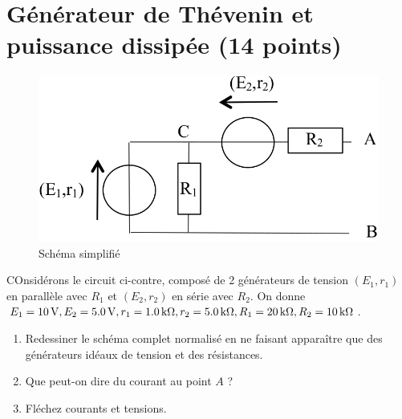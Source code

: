 \documentclass[10pt,a4paper]{article}
\begin{document}
\newpage

\section{Générateur de Thévenin et puissance dissipée (14 points)}
\begin{figure}
    \vspace*{-25pt}
    \raggedleft
    \includegraphics[width=\linewidth]{th_solo.png}
    \captionsetup{justification=centering}
    \caption{Schéma simplifié}
    \label{fig:solo}
\end{figure}
COnsidérons le circuit ci-contre, composé de 2 générateurs de tension 
$(E_1, r_1)$ en parallèle avec $R_1$ et $(E_2, r_2)$ en série avec $R_2$. On
donne $E_1 = \SI{10}{V}, E_2 = \SI{5.0}{V}, r_1= \SI{1.0}{k\Omega}, r_2 =
\SI{5.0}{k\Omega}, R_1 = \SI{20}{k\Omega}, R_2 = \SI{10}{k\Omega}$.

\begin{enumerate}[label=\color{brandeisblue}\arabic*)]
    \item Redessiner le schéma complet normalisé en ne faisant apparaître que
        des générateurs idéaux de tension et des résistances.
        \vspace{3cm}
    \item Que peut-on dire du courant au point $A$ ?
        \vspace{1cm}
    \item Fléchez courants et tensions.
\end{enumerate}
\end{document}
